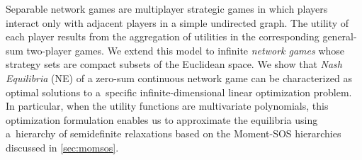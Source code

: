 Separable network games \cite{Bregman98,Cai16} are multiplayer strategic games in which players interact only with adjacent players in a simple undirected graph. The utility of each player results from the aggregation of utilities in the corresponding general-sum two-player games. We extend this model to infinite \emph{network games} whose strategy sets are compact subsets of the Euclidean space. We show that \emph{Nash Equilibria} (NE) of a zero-sum continuous network game can be characterized as optimal solutions to a~specific infinite-dimensional linear optimization problem. In particular, when the utility functions are multivariate polynomials, this optimization formulation enables us to approximate the equilibria using a~hierarchy of semidefinite relaxations based on the Moment-SOS hierarchies discussed in \cref{sec:momsos}.